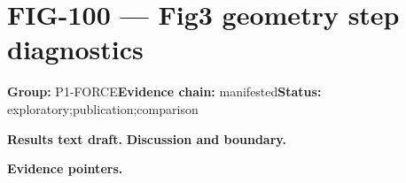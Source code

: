 \clearpage
\section{FIG-100 --- Fig3 geometry step diagnostics}
\label{figpage:fig-100}
\textbf{Group:} P1-FORCE\quad \textbf{Evidence chain:} manifested\quad \textbf{Status:} exploratory;publication;comparison

\textbf{Results text draft.} 
\textbf{Discussion and boundary.} 


\textbf{Evidence pointers.}



\vfill
